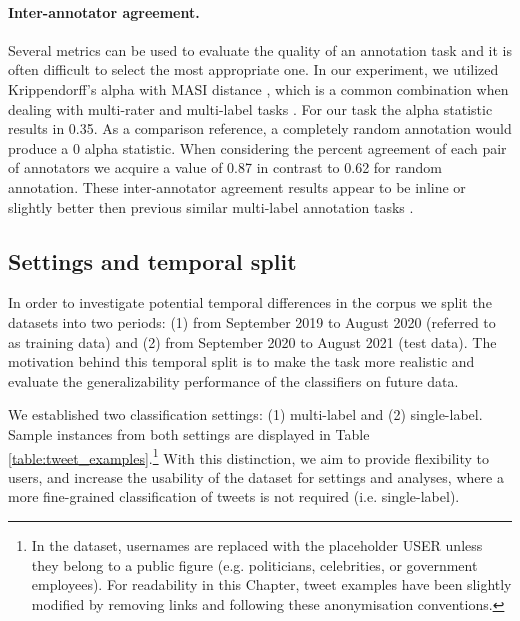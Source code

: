 \begin{table}[t]
\centering
{}
\caption{Number of total tweets after each step.}
\label{tab:num-tweets}
\end{table}

\paragraph{Inter-annotator agreement.}
Several metrics can be used to evaluate the quality of an annotation task \cite{artstein2008inter} and it is often difficult to select the most appropriate one. In our experiment, 
we utilized Krippendorff's alpha \cite{krippendorff2011computing} with MASI distance \cite{passonneau2006measuring}, which is a common combination when dealing with multi-rater and multi-label tasks \cite{artstein2008inter}. For our task the alpha statistic results in 0.35. As a comparison reference, a completely random annotation would produce a 0 alpha statistic. 
When considering the percent agreement of each pair of annotators we acquire a value of 0.87 in contrast to 0.62 for random annotation. 
These inter-annotator agreement results appear to be inline or slightly better then previous similar multi-label annotation tasks \cite{mohammad2018semeval}.


\subsection{Settings and temporal split}
\label{settings}
In order to investigate potential temporal differences in the corpus we split the datasets into two periods: (1) from September 2019 to August 2020 (referred to as training data) and (2) from September 2020 to August 2021 (test data). The motivation behind this temporal split is to make the task more realistic and evaluate the generalizability performance of the classifiers on future data.

We established two classification settings: (1) multi-label and (2) single-label. Sample instances from both settings are displayed in Table \ref{table:tweet_examples}.\footnote{In the dataset, usernames are replaced with the placeholder {{USER}} unless they belong to a public figure (e.g. politicians, celebrities, or government employees). For readability in this Chapter, tweet examples have been slightly modified by removing links and following these anonymisation conventions.} With this distinction, we aim to provide flexibility to users, and increase the usability of the dataset for settings and analyses, where a more fine-grained classification of tweets is not required (i.e. single-label).

